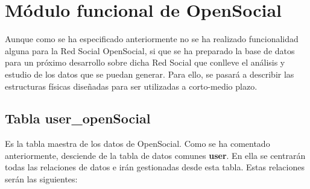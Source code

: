 \section{Módulo funcional de OpenSocial}
Aunque como se ha especificado anteriormente no se ha realizado funcionalidad alguna para la Red Social OpenSocial, si que se ha preparado la base de datos para un próximo desarrollo sobre dicha Red Social que conlleve el análisis y estudio de los datos que se puedan generar. Para ello, se pasará a describir las estructuras físicas diseñadas para ser utilizadas a corto-medio plazo.

\subsection{Tabla user\_openSocial}
Es la tabla maestra de los datos de OpenSocial. Como se ha comentado anteriormente, desciende de la tabla de datos comunes \textbf{user}. En ella se centrarán todas las relaciones de datos e irán gestionadas desde esta tabla. Estas relaciones serán las siguientes:

